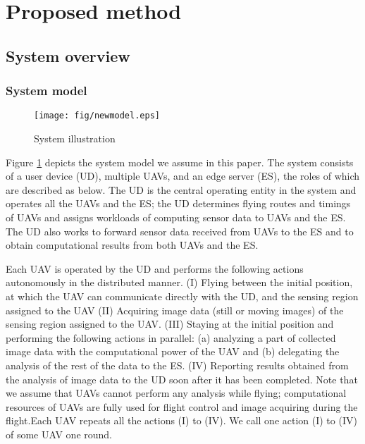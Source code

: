 \documentclass[journal]{IEEEtran}
\begin{document}
\section{Proposed method}\label{method}

\subsection{System overview}\label{sys}
\subsubsection{System model}\label{sysmo}

\begin{figure}[t]
\begin{center}
\texttt{[image: fig/newmodel.eps]}
\caption{System illustration}
\label{model}
\end{center}
\end{figure}

Figure \ref{model} depicts the system model we assume in this paper. 
The system consists of a user device (UD), multiple UAVs, and an edge server (ES), the roles of which are described as below.
%
The UD is the central operating entity in the system and operates all the UAVs and the ES; the UD determines flying routes and timings of UAVs and assigns workloads of computing sensor data to UAVs and the ES.
%
The UD also works to forward sensor data received from UAVs to the ES and to obtain computational results from both UAVs and the ES.

Each UAV is operated by the UD and performs the following actions autonomously in the distributed manner.
%
(I) Flying between the initial position, at which the UAV can communicate directly with the UD, and the sensing region assigned to the UAV 
(I\hspace{-.1em}I) Acquiring image data (still or moving images) of the sensing region assigned to the UAV.
(I\hspace{-.1em}I\hspace{-.1em}I) Staying at the initial position and performing the following actions in parallel: (a) analyzing a part of collected image data with the computational power of the UAV and (b) delegating the analysis of the rest of the data to the ES.
(I\hspace{-.1em}V) Reporting results obtained from the analysis of image data to the UD soon after it has been completed.
%
Note that we assume that UAVs cannot perform any analysis while flying; computational resources of UAVs are fully used for flight control and image acquiring during the flight.Each UAV repeats all the actions (I) to (I\hspace{-.1em}V). We call one action (I) to (I\hspace{-.1em}V) of some UAV one round.
\end{document}
